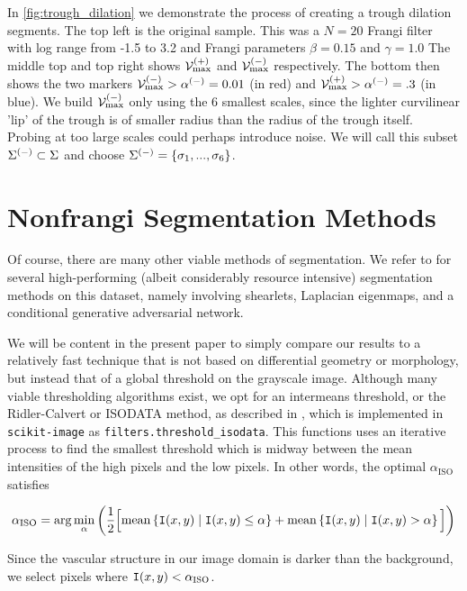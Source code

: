 In \cref{fig:trough_dilation} we demonstrate the process of creating a trough dilation segments. The top left is the original sample. This was a $N=20$ Frangi filter with log range from -1.5 to 3.2 and Frangi parameters $\beta=0.15$ and $\gamma=1.0$ The middle top and top right shows $\mathcal{V}_{\max}^{(+)}$ and $\mathcal{V}_{\max}^{(-)}$ respectively. The bottom then shows the two markers 
 $\mathcal{V}_{\max}^{(-)} > \alpha^{(-)} = 0.01$ (in red) and
 $\mathcal{V}_{\max}^{(+)} > \alpha^{(-)} = .3$ (in blue). We build $\mathcal{V}_{\max}^{(-)}$ only using the 6 smallest scales, since the lighter curvilinear 'lip' of the trough is of smaller radius than the radius of the trough itself. Probing at too large scales could perhaps introduce noise. We will call this subset $\Sigma^{(-)} \subset \Sigma $ and choose $\Sigma^{(-)}=\{\sigma_1 , ... , \sigma_6\}$.
 
 

\section{Nonfrangi Segmentation Methods}

Of course, there are many other viable methods of segmentation. We refer to \cite{anghel2018placental} for several high-performing (albeit considerably resource intensive) segmentation methods on this dataset, namely involving shearlets, Laplacian eigenmaps, and a conditional generative adversarial network.

We will be content in the present paper to simply compare our results to a relatively fast technique that is not based on differential geometry or morphology, but instead that of a global threshold on the grayscale image. Although many viable thresholding algorithms exist, we opt for an intermeans threshold, or the Ridler-Calvert or ISODATA method, as described in \cite{isodata}, which is implemented in \texttt{scikit-image} as \texttt{filters.threshold\_isodata}. This functions uses an iterative process to find the smallest threshold which is midway between the mean intensities of the high pixels and the low pixels. In other words, the optimal $\alpha_{\textrm{ISO}}$ satisfies

\begin{equation} \label{eq:ISODATA}
\alpha_{\textrm{ISO}} = \arg\min_{\alpha} \left( \frac{1}{2} \Big[
\textrm{mean}\left\{ \mathtt{I}(x,y) \;|\; \mathtt{I}(x,y) \le \alpha \right\} 
+
\textrm{mean}\left\{ \mathtt{I}(x,y) \;|\; \mathtt{I}(x,y) >   \alpha \right\}
 \Big]
 \right)
\end{equation}

Since the vascular structure in our image domain is darker than the background, we select pixels
where $\img(x,y) < \alphaiso$.



